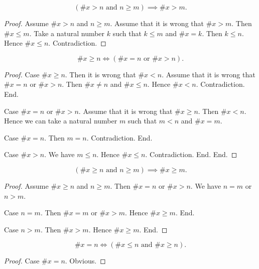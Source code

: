 \documentclass[../../set-theory.tex]{subfiles}
\begin{document}
\begin{forthel}
    \begin{proposition}\label{SetTheory_03_01_475214}
      \[ (\text{$\# x > n$ and $n \geq m$}) \implies \# x > m. \]
    \end{proposition}
    \begin{proof}
      Assume $\# x > n$ and $n \geq m$.
      Assume that it is wrong that $\# x > m$.
      Then $\# x \leq m$.
      Take a natural number $k$ such that $k \leq m$ and $\# x = k$.
      Then $k \leq n$.
      Hence $\# x \leq n$.
      Contradiction.
    \end{proof}

    \begin{proposition}\label{SetTheory_03_01_730763}
      \[ \# x \geq n \iff (\text{$\# x = n$ or $\# x > n$}). \]
    \end{proposition}
    \begin{proof}
      Case $\# x \geq n$.
        Then it is wrong that $\# x < n$.
        Assume that it is wrong that $\# x = n$ or $\# x > n$.
        Then $\# x \neq n$ and $\# x \leq n$.
        Hence $\# x < n$.
        Contradiction.
      End.

      Case $\# x = n$ or $\# x > n$.
        Assume that it is wrong that $\# x \geq n$.
        Then $\# x < n$.
        Hence we can take a natural number $m$ such that $m < n$ and $\# x = m$.

        Case $\# x = n$.
          Then $m = n$.
          Contradiction.
        End.

        Case $\# x > n$.
          We have $m \leq n$.
          Hence $\# x \leq n$.
          Contradiction.
        End.
      End.
    \end{proof}

    \begin{proposition}\label{SetTheory_03_01_268275}
      \[ (\text{$\# x \geq n$ and $n \geq m$}) \implies \# x \geq m. \]
    \end{proposition}
    \begin{proof}
      Assume $\# x \geq n$ and $n \geq m$.
      Then $\# x = n$ or $\# x > n$.
      We have $n = m$ or $n > m$.

      Case $n = m$.
        Then $\# x = m$ or $\# x > m$.
        Hence $\# x \geq m$.
      End.

      Case $n > m$.
        Then $\# x > m$.
        Hence $\# x \geq m$.
      End.
    \end{proof}

    \begin{proposition}\label{SetTheory_03_01_680939}
      \[ \# x = n \iff (\text{$\# x \leq n$ and $\# x \geq n$}). \]
    \end{proposition}
    \begin{proof}
      Case $\# x = n$. Obvious.


\end{proof}
\end{forthel}
\end{document}
